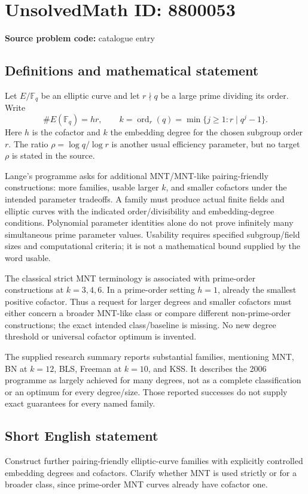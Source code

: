 \documentclass[11pt]{article}
\newcommand{\F}{\mathbb{F}}
\begin{document}
\section*{UnsolvedMath ID: 8800053}
\textbf{Source problem code:} catalogue entry
\subsection{Definitions and mathematical statement}
Let \(E/\F_q\) be an elliptic curve and let \(r\nmid q\) be a large prime dividing its order. Write
\[
\#E(\F_q)=h r,
\qquad k=\operatorname{ord}_r(q)
=\min\{j\ge1:r\mid q^j-1\}.
\]
Here \(h\) is the cofactor and \(k\) the embedding degree for the chosen subgroup order \(r\). The ratio \(\rho=\log q/\log r\) is another usual efficiency parameter, but no target \(\rho\) is stated in the source.

Lange's programme asks for additional MNT/MNT-like pairing-friendly constructions: more families, usable larger \(k\), and smaller cofactors under the intended parameter tradeoffs. A family must produce actual finite fields and elliptic curves with the indicated order/divisibility and embedding-degree conditions. Polynomial parameter identities alone do not prove infinitely many simultaneous prime parameter values. Usability requires specified subgroup/field sizes and computational criteria; it is not a mathematical bound supplied by the word usable.

The classical strict MNT terminology is associated with prime-order constructions at \(k=3,4,6\). In a prime-order setting \(h=1\), already the smallest positive cofactor. Thus a request for larger degrees and smaller cofactors must either concern a broader MNT-like class or compare different non-prime-order constructions; the exact intended class/baseline is missing. No new degree threshold or universal cofactor optimum is invented.

The supplied research summary reports substantial families, mentioning MNT, BN at \(k=12\), BLS, Freeman at \(k=10\), and KSS. It describes the 2006 programme as largely achieved for many degrees, not as a complete classification or an optimum for every degree/size. Those reported successes do not supply exact guarantees for every named family.
\subsection{Short English statement}
Construct further pairing-friendly elliptic-curve families with explicitly controlled embedding degrees and cofactors. Clarify whether MNT is used strictly or for a broader class, since prime-order MNT curves already have cofactor one.
\end{document}
